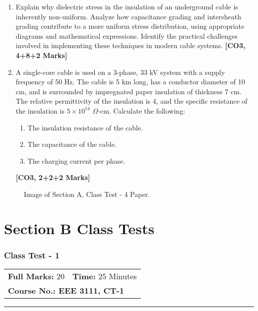\documentclass[12pt, a4paper]{article}
\begin{document}
	\begin{enumerate}[label=\textbf{\arabic*.}]
		\item Explain why dielectric stress in the insulation of an underground cable is inherently non-uniform. Analyze how capacitance grading and intersheath grading contribute to a more uniform stress distribution, using appropriate diagrams and mathematical expressions. Identify the practical challenges involved in implementing these techniques in modern cable systems. \hfill \textbf{[CO3, 4+8+2 Marks]}
		
		\item A single-core cable is used on a 3-phase, 33 kV system with a supply frequency of 50 Hz. The cable is 5 km long, has a conductor diameter of 10 cm, and is surrounded by impregnated paper insulation of thickness 7 cm. The relative permittivity of the insulation is 4, and the specific resistance of the insulation is $5 \times 10^{14}$ $\Omega$-cm. Calculate the following:
		\begin{enumerate}[label=\textbf{(\roman*)}]
			\item The insulation resistance of the cable.
			\item The capacitance of the cable.
			\item The charging current per phase.
		\end{enumerate}
		\hfill \textbf{[CO3, 2+2+2 Marks]}
	\end{enumerate}
	
	\begin{figure}[h!]
		\centering
		\caption{Image of Section A, Class Test - 4 Paper.}
	\end{figure}
	\newpage
	
	\part{Section B Class Tests}
	
	\section{Class Test - 1}
	\begin{tabular}{ll}
		\textbf{Full Marks:} 20 & \textbf{Time:} 25 Minutes \\
		\multicolumn{2}{l}{\textbf{Course No.: EEE 3111, CT-1}} \\
	\end{tabular}
	\hrule
	\vspace{0.5cm}
	
\end{document}
